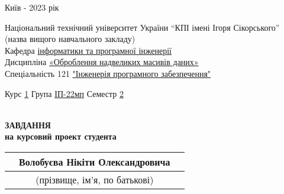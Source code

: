 \documentclass[14pt]{article}
\begin{document}
\vspace*{\fill}
\begin{center}
Київ - 2023 рік
\end{center}

\thispagestyle{empty}

\pagebreak

\begin{center}
\fontsize{14}{17}\selectfont
Національний технічний університет України “КПІ імені Ігоря Сікорського”\\
\fontsize{12}{14}\selectfont
(назва вищого навчального закладу)\\
Кафедра \underline{інформатики та програмної інженерії}\\
Дисципліна \underline{«Оброблення надвеликих масивів даних»}\\
Спеціальність 121 \underline{"Інженерія програмного забезпечення"}\\
\end{center}
Курс \underline{\hspace{1em}1\hspace{1em}} Група \underline{\hspace{1em}ІП-22мп\hspace{1em}} \hfill Семестр \underline{\hspace{0.5em}2\hspace{0.5em}}\\
\\

\fontsize{14}{17}\selectfont
\begin{center}
\textbf{ЗАВДАННЯ}\\
\textbf{на курсовий проект студента}\\

\begin{tabularx}{\textwidth}{X c X}
    & Волобуєва Нікіти Олександровича &\\
    \hline
    & \fontsize{9}{11}\selectfont (прізвище, ім’я, по батькові) &
\end{tabularx}
\end{center}
\end{document}
